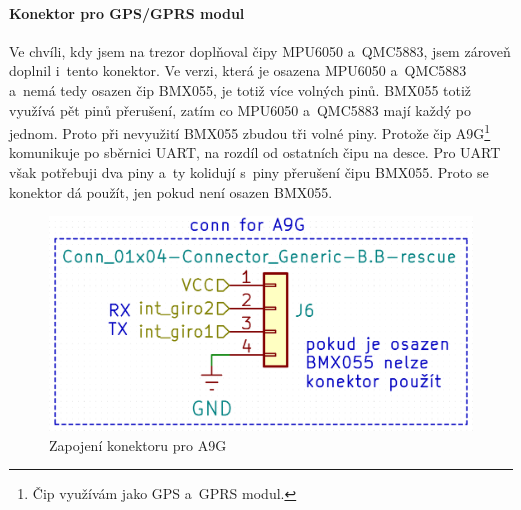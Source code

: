 \paragraph{Konektor pro GPS/GPRS modul}
\label{A9}
Ve chvíli, kdy jsem na trezor do\-pl\-ňo\-val čipy MPU6050 a~QMC5883, jsem zároveň doplnil i~tento konektor. Ve verzi, která je osazena MPU6050 a~QMC5883 a~nemá tedy osazen čip BMX055, 
je totiž více volných pinů. BMX055 totiž využívá pět pinů přerušení, zatím co MPU6050 a~QMC5883 mají každý po jednom. Proto při nevyužití BMX055 zbudou tři volné piny.
Protože čip A9G\footnote{Čip využívám jako GPS a~GPRS modul.} komunikuje po sběrnici UART, na rozdíl od ostatních čipu na desce. Pro UART však potřebuji
dva piny a~ty kolidují s~piny přerušení čipu BMX055. Proto se konektor dá použít, jen pokud není osazen BMX055.

\begin{figure}[h]
    \centering
    \includegraphics[width=\textwidth]{kapitoly/obrazky/E4/vnimani/conn-A9G.png}
    \caption{Zapojení konektoru pro A9G}
    \label{fig:E4-A9G}
\end{figure}

